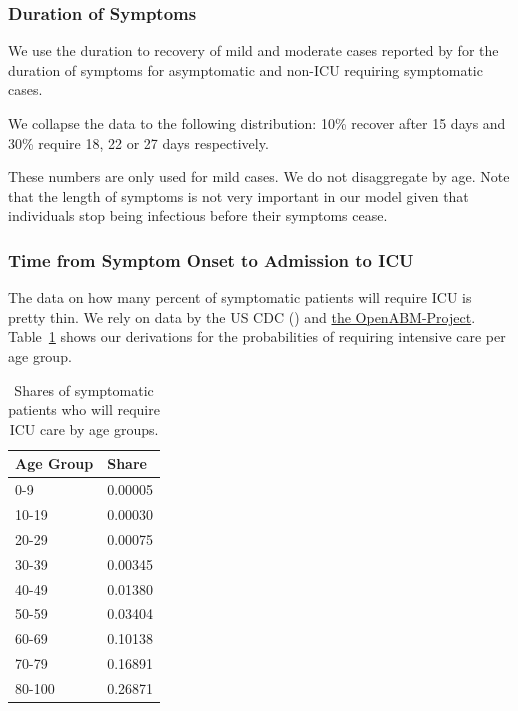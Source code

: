 \subsubsection{Duration of Symptoms}

We use the duration to recovery of mild and moderate cases reported by \cite[Figure~S3, Panel~2]{Bi2020} for the duration of symptoms for asymptomatic and non-ICU requiring symptomatic cases.

We collapse the data to the following distribution: 10\% recover after 15 days and 30\% require 18, 22 or 27 days respectively.


These numbers are only used for mild cases. We do not disaggregate by age. Note that the length of symptoms is not very important in our model given that individuals stop being infectious before their symptoms cease.


\subsubsection{Time from Symptom Onset to Admission to ICU}

The data on how many percent of symptomatic patients will require ICU is pretty thin. We rely on data by the US CDC (\cite{Stokes2020}) and \href{https://github.com/BDI-pathogens/OpenABM-Covid19/blob/572e24ca2dbf7153789a92ad3a27e4c515d0e576/documentation/parameters/parameter_dictionary.md}{the OpenABM-Project}. Table~\ref{tab:symptomatic-to-ICU} shows our derivations for the probabilities of requiring intensive care per age group.

\begin{table}[tb]
    \caption{Shares of symptomatic patients who will require ICU care by age groups.}
    \label{tab:symptomatic-to-ICU}
    \centering

    \begin{tabular}{ll}
        \toprule
        Age Group & Share \\
        \midrule
        0-9 & 0.00005 \\
        10-19 & 0.00030 \\
        20-29 & 0.00075 \\
        30-39 & 0.00345 \\
        40-49 & 0.01380 \\
        50-59 & 0.03404 \\
        60-69 & 0.10138 \\
        70-79 & 0.16891 \\
        80-100 & 0.26871 \\
        \bottomrule
    \end{tabular}


\end{table}

